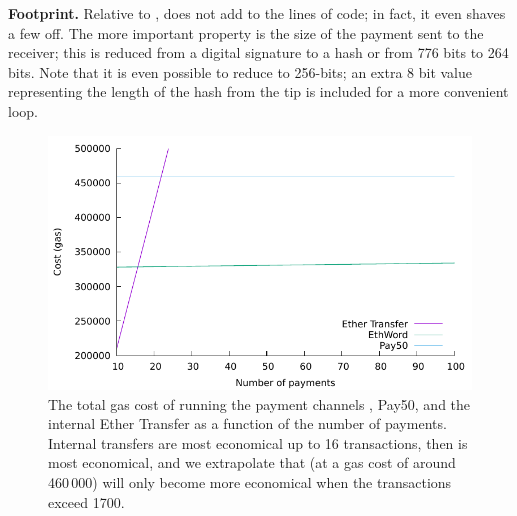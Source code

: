 
\textbf{Footprint.} Relative to \fifty, \ew does not add to the lines of code; in fact, it even shaves a few off. The more important property is the size of the payment sent to the receiver; this is reduced from a digital signature to a hash or from 776 bits to 264 bits. Note that it is even possible to reduce \eww to 256-bits; an extra 8 bit value representing the length of the hash from the tip is included for a more convenient loop.

\begin{figure}[t]
\centering

\includegraphics[width=0.6\linewidth]{figures/gas.pdf}
\setlength{\belowcaptionskip}{-10pt}
\caption{The total gas cost of running the payment channels \ew, \textsf{Pay50}, and the internal Ether Transfer as a function of the number of payments. Internal transfers are most economical up to 16 transactions, then \ew is most economical, and we extrapolate that \fifty (at a gas cost of around 460\,000) will only become more economical when the transactions exceed 1700.\label{fig:gas}}
	
\end{figure}

